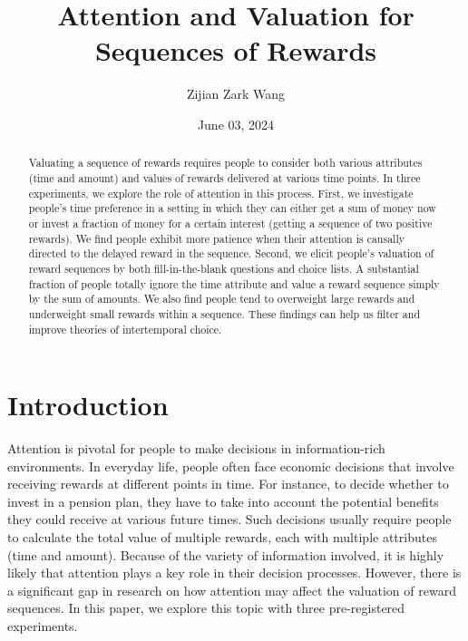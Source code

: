 \documentclass[
  12pt,
]{article}
\title{Attention and Valuation for Sequences of Rewards}
\author{Zijian Zark Wang}
\date{June 03, 2024}
\begin{document}
\maketitle
\begin{abstract}
Valuating a sequence of rewards requires people to consider both various
attributes (time and amount) and values of rewards delivered at various
time points. In three experiments, we explore the role of attention in
this process. First, we investigate people's time preference in a
setting in which they can either get a sum of money now or invest a
fraction of money for a certain interest (getting a sequence of two
positive rewards). We find people exhibit more patience when their
attention is causally directed to the delayed reward in the sequence.
Second, we elicit people's valuation of reward sequences by both
fill-in-the-blank questions and choice lists. A substantial fraction of
people totally ignore the time attribute and value a reward sequence
simply by the sum of amounts. We also find people tend to overweight
large rewards and underweight small rewards within a sequence. These
findings can help us filter and improve theories of intertemporal
choice.
\end{abstract}

\hypertarget{introduction}{%
\section{Introduction}\label{introduction}}

Attention is pivotal for people to make decisions in information-rich
environments. In everyday life, people often face economic decisions
that involve receiving rewards at different points in time. For
instance, to decide whether to invest in a pension plan, they have to
take into account the potential benefits they could receive at various
future times. Such decisions usually require people to calculate the
total value of multiple rewards, each with multiple attributes (time and
amount). Because of the variety of information involved, it is highly
likely that attention plays a key role in their decision processes.
However, there is a significant gap in research on how attention may
affect the valuation of reward sequences. In this paper, we explore this
topic with three pre-registered experiments.
\end{document}
